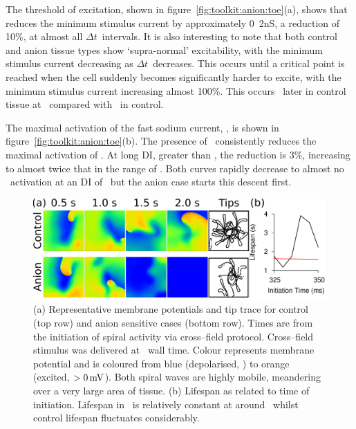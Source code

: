The threshold of excitation, shown in figure~\ref{fig:toolkit:anion:toe}(a), shows that
 reduces the minimum stimulus current by approximately \unit{0.2}{nS},
a reduction of 10\%, at almost all $\Delta t$\ intervals.  It is also
interesting to note that both control and anion tissue types show `supra-normal'
excitability, with the minimum stimulus current decreasing as $\Delta t$\
decreases.  This occurs until a critical point is reached when the cell suddenly
becomes significantly harder to excite, with the minimum stimulus current
increasing almost 100\%.
This occurs \ later in control tissue at
\, compared with \ in control.

The maximal activation of the fast sodium current, , is shown in
figure~\ref{fig:toolkit:anion:toe}(b).
The presence of \ consistently reduces the maximal activation of .
At long DI, greater than \ms{400}, the reduction is 3\%, increasing to almost
twice that in the range of \msrange{150}{200}.
Both curves rapidly decrease to almost no \ activation at an DI of
\ms{0}\ but the anion case starts this descent first.
\begin{figure}
\begin{center}
\includegraphics{figures/toolkit/anion/twod_traces}
\end{center}
\caption[Anion Sensitive Tissue Sheets and Spiral Lifespands]{
\label{fig:toolkit:anion:spiral}
(a)
Representative membrane potentials and tip trace for control (top row) and anion
sensitive cases (bottom row).
Times are from the initiation of spiral activity via cross--field protocol.
Cross--field stimulus was delivered at \ms{345}\ wall time.
Colour represents membrane potential and is coloured from blue (depolarised,
\mv{-80}) to orange (excited, $>0\,\text{mV}$).
Both spiral waves are highly mobile, meandering over a very large area of
tissue.
(b)
Lifespan as related to time of initiation.
Lifespan in \ is relatively constant at around \ whilst
control lifespan fluctuates considerably.
}
\end{figure}
